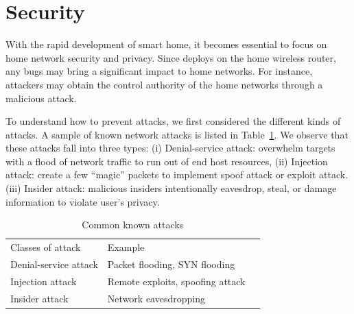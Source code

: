 \section{Security}
\label{sec.security}
With the rapid development of smart home, it becomes essential to focus on home network security and privacy. Since \sysname deploys on the home wireless router, any bugs may bring a significant impact to home networks. For instance, attackers may obtain the control authority of the home networks through a malicious attack. 

To understand how to prevent attacks, we first considered the different kinds of attacks. A sample of known network attacks is listed in Table~\ref{table: attack}. We observe that these attacks fall into three types: (i) Denial-service attack: overwhelm targets with a flood of network traffic to run out of end host resources, (ii) Injection attack: create a few ``magic'' packets to implement spoof attack or exploit attack. (iii) Insider attack: malicious insiders intentionally eavesdrop, steal, or damage information to violate user's privacy.

\begin{table}[]
\centering
\begin{tabular}{|l|l|l}
\cline{1-2}
Classes of attack     & Example                                 &  \\ \cline{1-2}
Denial-service attack & Packet flooding, SYN flooding\cite{eddy2011syn}             &  \\ \cline{1-2}
Injection attack      & Remote exploits\cite{shellcode},  spoofing attack\cite{bishop1996attack} &  \\ \cline{1-2}
Insider attack        & Network eavesdropping                   &  \\ \cline{1-2}
\end{tabular}
\caption{Common known attacks}
\label{table: attack}
\end{table}

